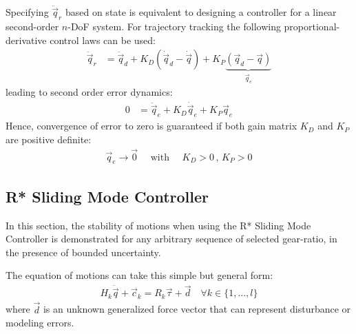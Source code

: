 Specifying $\ddot{\vec{q}}_r$ based on state is equivalent to designing a controller for a linear second-order $n$-DoF system. For trajectory tracking the following proportional-derivative control laws can be used:
\begin{align}
\ddot{\vec{q}}_r &= \ddot{\vec{q}}_d + K_D ( \dot{\vec{q}}_d - \dot{\vec{q}} ) + K_P \underbrace{( \vec{q}_d - \vec{q} ) }_{\vec{q}_e}
\end{align}
leading to second order error dynamics:
\begin{align}
0 &= \ddot{\vec{q}}_e + K_D \dot{\vec{q}}_e + K_P \vec{q}_e
\end{align}
Hence, convergence of error to zero is guaranteed if both gain matrix $K_D$ and $K_P$ are positive definite:
\begin{align}
\vec{q}_e \rightarrow \vec{0} \quad\text{ with }\quad K_D > 0 \, , \, K_P > 0
\end{align}


\subsection{R* Sliding Mode Controller}
\label{sec:stabrstar2}

In this section, the stability of motions when using the R* Sliding Mode Controller is demonstrated for any arbitrary sequence of selected gear-ratio, in the presence of bounded uncertainty.

The equation of motions can take this simple but general form:
\begin{align}
H_k \ddot{\vec{q}} + \vec{c}_k = R_k \vec{\tau} + \vec{d} \quad \forall k \in \{1,...,l\}
\label{eq:eom_kd}
\end{align}
where $\vec{d}$ is an unknown generalized force vector that can represent disturbance or modeling errors.

